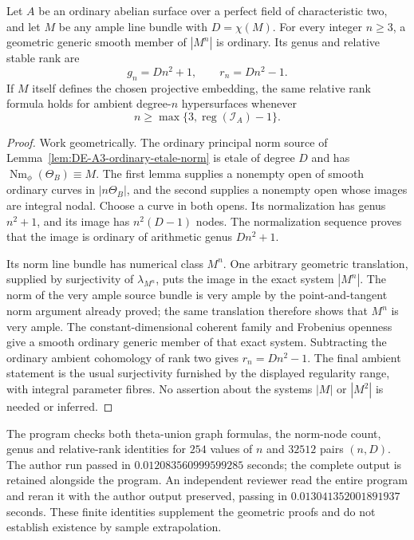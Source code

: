 \begin{theorem}
\label{thm:DE-A3-ordinary-arbitrary-embedding}
Let $A$ be an ordinary abelian surface over a perfect field of
characteristic two, and let $M$ be any ample line bundle with
$D=\chi(M)$.  For every integer $n\ge3$, a geometric generic smooth
member of $|M^n|$ is ordinary.  Its genus and relative stable rank are
\[
                         g_n=Dn^2+1,
                         \qquad r_n=Dn^2-1.
\]
If $M$ itself defines the chosen projective embedding, the same
relative rank formula holds for ambient degree-$n$ hypersurfaces
whenever
\[
               n\ge\max\{3,\operatorname{reg}(\mathcal I_A)-1\}.
\]
\end{theorem}
\begin{proof}
Work geometrically.  The ordinary principal norm source of
Lemma~\ref{lem:DE-A3-ordinary-etale-norm} is etale of degree $D$
and has $\operatorname{Nm}_\phi(\Theta_B)\equiv M$.
The first lemma supplies a nonempty open of smooth ordinary curves
in $|n\Theta_B|$, and the second supplies a nonempty open whose
images are integral nodal.  Choose a curve in both opens.  Its
normalization has genus $n^2+1$, and its image has
$n^2(D-1)$ nodes.  The normalization sequence proves that the
image is ordinary of arithmetic genus $Dn^2+1$.

Its norm line bundle has numerical class $M^n$.  One arbitrary
geometric translation, supplied by surjectivity of $\lambda_{M^n}$,
puts the image in the exact system $|M^n|$.
The norm of the very ample source bundle is very ample by the
point-and-tangent norm argument already proved; the same translation
therefore shows that $M^n$ is very ample.  The constant-dimensional
coherent family and Frobenius openness give a smooth ordinary generic
member of that exact system.  Subtracting the ordinary ambient
cohomology of rank two gives $r_n=Dn^2-1$.
The final ambient statement is the usual surjectivity furnished by
the displayed regularity range, with integral parameter fibres.
No assertion about the systems $|M|$ or $|M^2|$ is needed or inferred.
\end{proof}

\begin{remark}
\label{rem:DE-A3-ordinary-arbitrary-embedding-checks}
The program
checks both theta-union graph formulas, the norm-node count, genus and
relative-rank identities for $254$ values of $n$ and $32512$ pairs
$(n,D)$.  The author run passed in $0.012083560999599285$ seconds;
the complete output is retained alongside the program.  An independent
reviewer read the entire program and reran it with the author output
preserved, passing in $0.013041352001891937$ seconds.  These finite
identities supplement the geometric proofs and do not establish
existence by sample extrapolation.
\end{remark}


